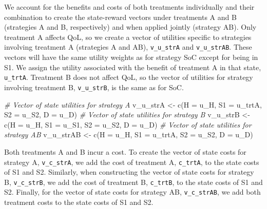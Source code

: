 \documentclass[
]{article}
\newenvironment{Shaded}{\begin{snugshade}}{\end{snugshade}}
\newcommand{\AttributeTok}[1]{\textcolor[rgb]{0.77,0.63,0.00}{#1}}
\newcommand{\CommentTok}[1]{\textcolor[rgb]{0.56,0.35,0.01}{\textit{#1}}}
\newcommand{\FunctionTok}[1]{\textcolor[rgb]{0.00,0.00,0.00}{#1}}
\newcommand{\NormalTok}[1]{#1}
\newcommand{\OtherTok}[1]{\textcolor[rgb]{0.56,0.35,0.01}{#1}}
\begin{document}
We account for the benefits and costs of both treatments individually and their combination to create the state-reward vectors under treatments A and B (strategies A and B, respectively) and when applied jointly (strategy AB). Only treatment A affects QoL, so we create a vector of utilities specific to strategies involving treatment A (strategies A and AB), \texttt{v\_u\_strA} and \texttt{v\_u\_strAB}. These vectors will have the same utility weights as for strategy SoC except for being in S1. We assign the utility associated with the benefit of treatment A in that state, \texttt{u\_trtA}. Treatment B does not affect QoL, so the vector of utilities for strategy involving treatment B, \texttt{v\_u\_strB}, is the same as for SoC.

\begin{Shaded}
\begin{Highlighting}[]
\CommentTok{\# Vector of state utilities for strategy A}
\NormalTok{v\_u\_strA }\OtherTok{\textless{}{-}} \FunctionTok{c}\NormalTok{(}\AttributeTok{H =}\NormalTok{ u\_H, }\AttributeTok{S1 =}\NormalTok{ u\_trtA, }\AttributeTok{S2 =}\NormalTok{ u\_S2, }\AttributeTok{D =}\NormalTok{ u\_D)}
\CommentTok{\# Vector of state utilities for strategy B}
\NormalTok{v\_u\_strB }\OtherTok{\textless{}{-}} \FunctionTok{c}\NormalTok{(}\AttributeTok{H =}\NormalTok{ u\_H, }\AttributeTok{S1 =}\NormalTok{ u\_S1, }\AttributeTok{S2 =}\NormalTok{ u\_S2, }\AttributeTok{D =}\NormalTok{ u\_D)}
\CommentTok{\# Vector of state utilities for strategy AB}
\NormalTok{v\_u\_strAB }\OtherTok{\textless{}{-}} \FunctionTok{c}\NormalTok{(}\AttributeTok{H =}\NormalTok{ u\_H, }\AttributeTok{S1 =}\NormalTok{ u\_trtA, }\AttributeTok{S2 =}\NormalTok{ u\_S2, }\AttributeTok{D =}\NormalTok{ u\_D)}
\end{Highlighting}
\end{Shaded}

Both treatments A and B incur a cost. To create the vector of state costs for strategy A, \texttt{v\_c\_strA}, we add the cost of treatment A, \texttt{c\_trtA}, to the state costs of S1 and S2. Similarly, when constructing the vector of state costs for strategy B, \texttt{v\_c\_strB}, we add the cost of treatment B, \texttt{c\_trtB}, to the state costs of S1 and S2. Finally, for the vector of state costs for strategy AB, \texttt{v\_c\_strAB}, we add both treatment costs to the state costs of S1 and S2.
\end{document}

